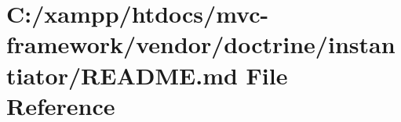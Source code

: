 \hypertarget{vendor_2doctrine_2instantiator_2_r_e_a_d_m_e_8md}{}\section{C\+:/xampp/htdocs/mvc-\/framework/vendor/doctrine/instantiator/\+R\+E\+A\+D\+ME.md File Reference}
\label{vendor_2doctrine_2instantiator_2_r_e_a_d_m_e_8md}
